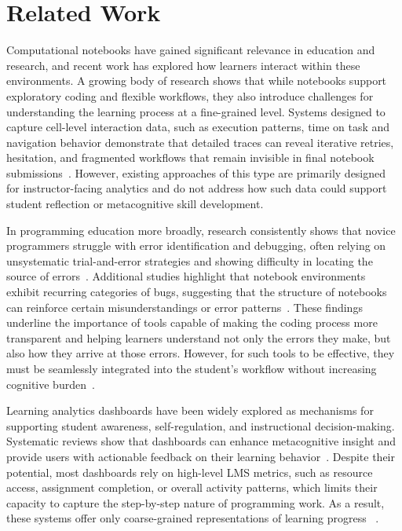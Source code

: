 \section{Related Work}

Computational notebooks have gained significant relevance in education and research, and recent work has explored how learners interact within these environments. A growing body of research shows that while notebooks support exploratory coding and flexible workflows, they also introduce challenges for understanding the learning process at a fine-grained level. Systems designed to capture cell-level interaction data, such as execution patterns, time on task and navigation behavior demonstrate that detailed traces can reveal iterative retries, hesitation, and fragmented workflows that remain invisible in final notebook submissions~\cite{cai2025jupyter}. However, existing approaches of this type are primarily designed for instructor-facing analytics and do not address how such data could support student reflection or metacognitive skill development.

In programming education more broadly, research consistently shows that novice programmers struggle with error identification and debugging, often relying on unsystematic trial-and-error strategies and showing difficulty in locating the source of errors~\cite{robinson2022error}. Additional studies highlight that notebook environments exhibit recurring categories of bugs, suggesting that the structure of notebooks can reinforce certain misunderstandings or error patterns~\cite{de2022bug}. These findings underline the importance of tools capable of making the coding process more transparent and helping learners understand not only the errors they make, but also how they arrive at those errors. However, for such tools to be effective, they must be seamlessly integrated into the student's workflow without increasing cognitive burden~\cite{corrin2014exploring}.

Learning analytics dashboards have been widely explored as mechanisms for supporting student awareness, self-regulation, and instructional decision-making. Systematic reviews show that dashboards can enhance metacognitive insight and provide users with actionable feedback on their learning behavior~\cite{schwendimann2016perceiving}. Despite their potential, most dashboards rely on high-level LMS metrics, such as resource access, assignment completion, or overall activity patterns, which limits their capacity to capture the step-by-step nature of programming work. As a result, these systems offer only coarse-grained representations of learning progress ~\cite{paulsen2024learning}.

